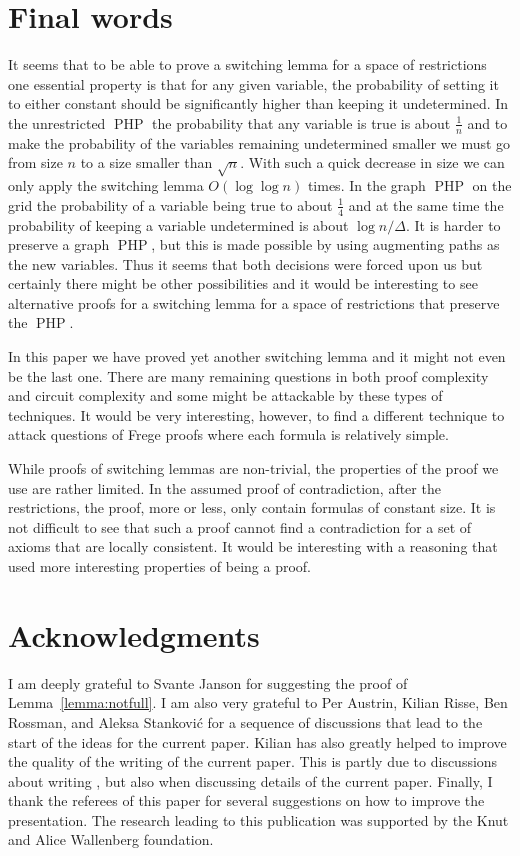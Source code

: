 \documentclass{theoretics}
\DeclareMathOperator{\PHP}{PHP}
\begin{document}
\section{Final words}\label{sec:conclusion}

It seems that to be able to prove a switching lemma for a
space of restrictions one essential property is that for any
given variable, the probability of setting it to either constant
should be significantly higher than keeping it undetermined.
In the unrestricted $\PHP$ the probability that any variable is true is 
about $\frac 1n$ and to make the probability of the variables
remaining undetermined smaller we must go from size $n$ to a size
smaller than $\sqrt n$.  With such a quick decrease in
size we can only apply the switching lemma $O (\log \log n)$
times.  In the graph $\PHP$ on the grid the
probability of a variable being true to about $\frac 14$
and at the same time the probability of keeping a variable
undetermined is about $\log n/\Delta$.
It is harder to preserve a graph $\PHP$, but this is 
made possible by using augmenting paths as the new
variables.  Thus it seems that both decisions were forced
upon us but certainly there might be other possibilities and
it would be interesting to see alternative proofs for a
switching lemma for a space of restrictions that preserve
the $\PHP$.

In this paper we have proved yet another switching lemma and 
it might not even be the last one.  There are many remaining
questions in both proof complexity and circuit complexity 
and some might be attackable by these types of techniques.
It would be very interesting, however, to find a different
technique to attack questions of Frege proofs where each
formula is relatively simple.

While proofs of switching lemmas are non-trivial, the 
properties of the proof we use are rather limited.
In the assumed proof of contradiction, after the
restrictions, the proof, more or less, only contain formulas of constant
size.  It is not difficult to see that such
a proof cannot find a contradiction for 
a set of axioms that are locally consistent.  
It would be interesting with a reasoning that used
more interesting properties of being a proof.

\section*{Acknowledgments}  

I am deeply grateful to
Svante Janson for suggesting the proof of Lemma~\ref{lemma:notfull}.
I am also very grateful to Per Austrin, Kilian Risse, Ben Rossman,
and Aleksa Stankovi\'c
for a sequence of discussions that lead to the start of the
ideas for the current paper.  
Kilian has also greatly helped to improve the quality of the writing
of the current paper.  This is partly due to discussions about
writing \cite{jhkr}, but also when discussing details of
the current paper.
Finally, I thank the referees of
this paper for several suggestions on how to improve the 
presentation.
The research leading to this publication
was supported by the Knut
and Alice Wallenberg foundation.  
\end{document}
